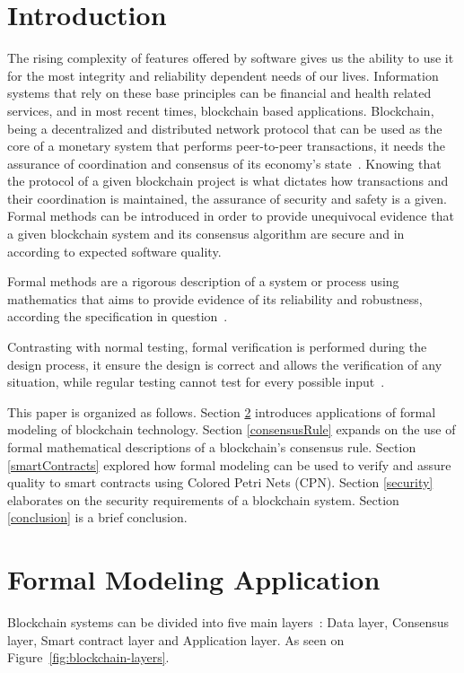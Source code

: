 \documentclass[sigconf, nonacm]{acmart}
\begin{document}
\section{Introduction}
The rising complexity of features offered by software gives us the ability to use it for the most integrity and reliability dependent needs of our lives. 
Information systems that rely on these base principles can be financial and health related services, and in most recent times, blockchain based applications. 
Blockchain, being a decentralized and distributed network protocol that can be used as the core of a monetary system that performs peer-to-peer transactions, 
it needs the assurance of coordination and consensus of its economy’s state~\cite{Duan2018}. 
Knowing that the protocol of a given blockchain project is what dictates how transactions and their coordination is maintained, the assurance of security and safety is a given. 
Formal methods can be introduced in order to provide unequivocal evidence that a given blockchain system and its consensus algorithm are secure and in according to expected software quality.

Formal methods are a rigorous description of a system or process using mathematics that aims to provide evidence of its reliability and robustness, 
according the specification in question~\cite{Regan2014}.

Contrasting with normal testing, formal verification is performed during the design process, it ensure the design is correct and allows the verification
of any situation, while regular testing cannot test for every possible input~\cite{Murray2019}.

This paper is organized as follows. Section \ref{formalModeling} introduces applications of formal modeling of blockchain technology.
Section \ref{consensusRule} expands on the use of formal mathematical descriptions of a blockchain's consensus rule.
Section \ref{smartContracts} explored how formal modeling can be used to verify and assure quality to smart contracts using Colored Petri Nets (CPN).
Section \ref{security} elaborates on the security requirements of a blockchain system.
Section \ref{conclusion} is a brief conclusion.

\section{Formal Modeling Application}\label{formalModeling}
Blockchain systems can be divided into five main layers~\cite{Duan2018}: Data layer, Consensus layer, Smart contract layer and Application layer. 
As seen on Figure~\ref{fig:blockchain-layers}.
\end{document}

